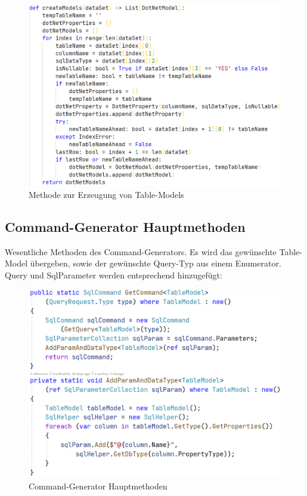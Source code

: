 \documentclass[11pt,toc=sectionentrywithoutdots, 
headheight=44pt, headings=optiontoheadandtoc, hyperfootnotes=false, hypertexnames=false]{scrartcl}
\begin{document}
 \begin{figure}[H]

	\includegraphics[scale=0.6]{modelGenerierung.PNG}
	 \caption{Methode zur Erzeugung von Table-Models}
 \end{figure}
 \clearpage

\subsection{Command-Generator Hauptmethoden}
Wesentliche Methoden des Command-Generators. Es wird das gewünschte Table-Model übergeben, sowie der gewünschte Query-Typ aus einem Enumerator. Query und SqlParameter werden entsprechend hinzugefügt:
 \label{fig:Command-Generator Hauptmethoden}

 \begin{figure}[H]

	\includegraphics[scale=0.6]{commandGenerator.PNG}
	 \caption{Command-Generator Hauptmethoden}
 \end{figure}
 
\end{document}
